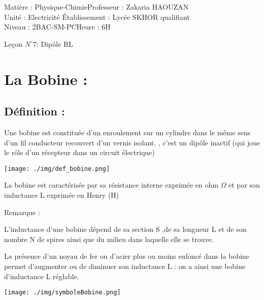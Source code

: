 \documentclass[12pt]{article}
\author{Zakaria HAOUZAN}
\date{\today}
\newcommand\headerMe[2]{\noindent{}#1\hfill#2}
\begin{document}
\headerMe{Matière : Physique-Chimie}{Professeur : Zakaria HAOUZAN}\\
\headerMe{Unité : Electricité }{Établissement : Lycée SKHOR qualifiant}\\
\headerMe{Niveau : 2BAC-SM-PC}{Heure : 6H}\\

\begin{center}

    \Large{Leçon $N^{\circ} 7 $: \color{red} Dipôle RL }
\end{center}


\section{La Bobine : }
\subsection{Définition : }

 Une bobine est constituée d'un enroulement sur un cylindre dans le même sens d'un fil conducteur recouvert d’un vernis
isolant. , c'est un dipôle inactif (qui joue le rôle d'un récepteur dans un circuit électrique)

\begin{center}
	\texttt{[image: ./img/def\_bobine.png]}
\end{center}

La bobine est caractérisée par sa résistance interne exprimée en ohm $\Omega$ et par son inductance L exprimée en Henry (H)

\begin{tcolorbox}
	Remarque : 

L'inductance d'une bobine dépend de sa section S ,de sa longueur L et de son nombre N de spires ainsi
que du milieu dans laquelle elle se trouve.

La présence d’un noyau de fer ou d’acier plus ou moins enfoncé dans la bobine permet d’augmenter ou de diminuer
son inductance L : on a ainsi une bobine d’inductance L réglable.
\end{tcolorbox}

\begin{center}
	\texttt{[image: ./img/symboleBobine.png]}
\end{center}
\end{document}
